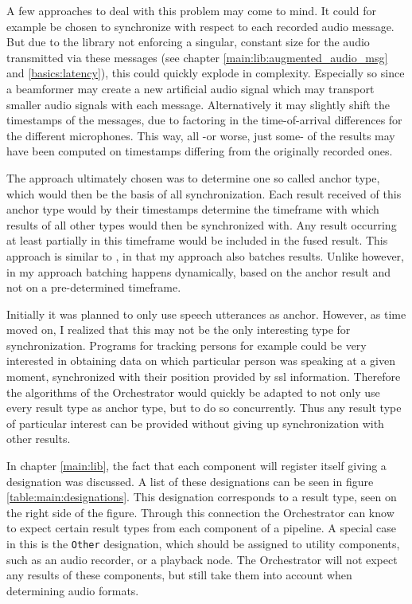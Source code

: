 A few approaches to deal with this problem may come to mind.
It could for example be chosen to synchronize with respect to each recorded audio message.
But due to the library not enforcing a singular, constant size for the audio transmitted via these messages (see chapter \ref{main:lib:augmented_audio_msg} and \ref{basics:latency}), this could quickly explode in complexity.
Especially so since a beamformer may create a new artificial audio signal which may transport smaller audio signals with each message.
Alternatively it may slightly shift the timestamps of the messages, due to factoring in the time-of-arrival differences for the different microphones.
This way, all -or worse, just some- of the results may have been computed on timestamps differing from the originally recorded ones.

The approach ultimately chosen was to determine one so called anchor type, which would then be the basis of all synchronization.
Each result received of this anchor type would by their timestamps determine the timeframe with which results of all other types would then be synchronized with.
Any result occurring at least partially in this timeframe would be included in the fused result.
This approach is similar to \cite{10.1117/12.138164}, in that my approach also batches results.
Unlike \cite{10.1117/12.138164} however, in my approach batching happens dynamically, based on the anchor result and not on a pre-determined timeframe.

Initially it was planned to only use speech utterances as anchor.
However, as time moved on, I realized that this may not be the only interesting type for synchronization.
Programs for tracking persons for example could be very interested in obtaining data on which particular person was speaking at a given moment, synchronized with their position provided by \gls{ssl} information.
Therefore the algorithms of the Orchestrator would quickly be adapted to not only use every result type as anchor type, but to do so concurrently.
Thus any result type of particular interest can be provided without giving up synchronization with other results.

In chapter \ref{main:lib}, the fact that each component will register itself giving a designation was discussed.
A list of these designations can be seen in figure \ref{table:main:designations}.
This designation corresponds to a result type, seen on the right side of the figure.
Through this connection the Orchestrator can know to expect certain result types from each component of a pipeline.
A special case in this is the \texttt{Other} designation, which should be assigned to utility components, such as an audio recorder, or a playback node.
The Orchestrator will not expect any results of these components, but still take them into account when determining audio formats.

